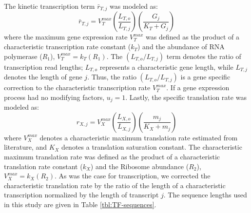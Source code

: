 \documentclass[12pt]{article}
\begin{document}
The kinetic transcription term $\bar{r}_{T,j}$ was modeled as:
\begin{equation}
	\bar{r}_{T,j} = V^{max}_{T}\left(\frac{L_{T,o}}{L_{T,j}}\right)\left(\frac{G_{j}}{K_{T}+G_{j}}\right)
\end{equation}where the maximum gene expression rate $V^{max}_{T}$ was defined as the product of a characteristic transcription rate constant ($k_{T}$)
and the abundance of RNA polymerase ($R_{1}$), $V^{max}_{T} = k_{T}\left(R_{1}\right)$.
The $\left(L_{T,o}/L_{T,j}\right)$ term denotes the ratio of transcription read lengths; $L_{T,o}$ represents a characteristic gene length, while $L_{T,j}$ denotes the length of gene $j$.
Thus, the ratio $\left(L_{T,o}/L_{T,j}\right)$ is a gene specific correction to the characteristic transcription rate $V^{max}_{T}$.
If a gene expression process had no modifying factors, $u_{j}=1$.
Lastly, the specific translation rate was modeled as:
\begin{equation}
	r_{X,j} = V^{max}_{X}\left(\frac{L_{X,o}}{L_{X,j}}\right)\left(\frac{m_{j}}{K_{X}+m_{j}}\right)
\end{equation}
where $V^{max}_{X}$ denotes a characteristic maximum translation rate estimated from literature, and $K_{X}$ denotes a translation saturation constant.
The characteristic maximum translation rate was defined as the product of a characteristic translation rate constant ($k_{X}$)
and the Ribosome abundance ($R_{2}$), $V^{max}_{X} = k_{X}\left(R_{2}\right)$. As was the case for transcription,
we corrected the characteristic translation rate by the ratio of the length of a characteristic transcription normalized by the length of transcript $j$.
The sequence lengths used in this study are given in Table \ref{tbl:TF-sequences}.
\end{document}
